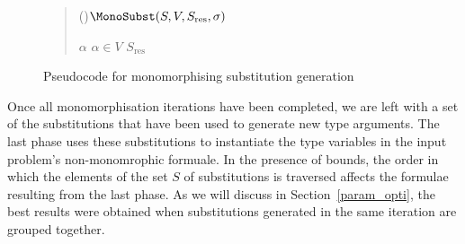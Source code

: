 \documentclass[]{ceurart}
\def\negvthinspace{\kern-0.083333em}
\begin{document}
\begin{figure}
\begin{quote}
   \begin{algorithm}[H]


   \Fn(){\(\MonoSubst(S, V, S_{\text{res}}, \sigma)\)}{


   \BlankLine

   \eIf{\(V = \emptyset\)}{
    \Return \(S_{\text{res}}\cup\{\sigma\}\)\;%
   }
   {
      \Let \(\alpha \) \ST \(\alpha\in V\)\;
      \ForEach{\(\sigma_{\negvthinspace\Delta}\in S\) \ST \(\alpha\in\Domain(\sigma_{\negvthinspace\Delta})\) \And \(\Compatible(\sigma,\sigma_{\negvthinspace\Delta})\)}{
         \textcolor{ourblueviolet}{
         \eIf{\(|S_{\text{res}}|<\MonoSubstsLimit\)}{
            \textcolor{black}{
            \(S_{\text{res}}\leftarrow \MonoSubst(S, V\setminus\Domain(\sigma_{\negvthinspace\Delta}), S_{\text{res}}, \sigma_{\negvthinspace\Delta}\circ\sigma)\)\;}
         }
         {\Return \(S_{\text{res}}\)}}
      }
      \Return \(S_{\text{res}}\)\;
   }
   }


\end{algorithm}
\end{quote}
\caption{Pseudocode for monomorphising substitution generation}
\label{mono_substs}
\end{figure}

Once all monomorphisation iterations have been completed, we are left with a set of the substitutions that have been used to generate new type arguments. The last phase uses these substitutions to instantiate the type variables in the input problem's non-monomrophic formuale. In the presence of bounds, the order in which the elements of the set \(S\) of substitutions is traversed affects the formulae resulting from the last phase. As we will discuss in Section~\ref{param_opti}, the best results were obtained when substitutions generated in the same iteration are grouped together.
\end{document}
